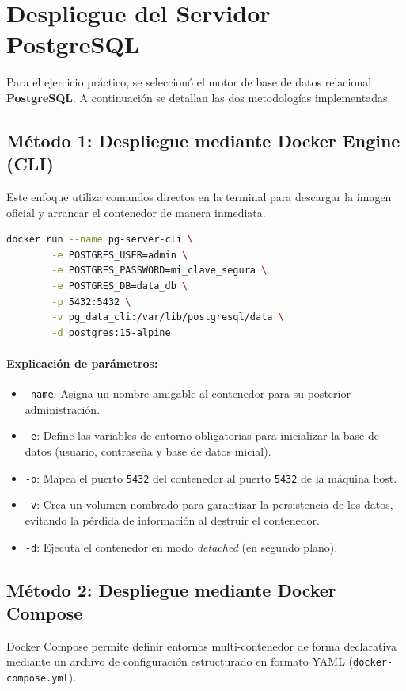 \documentclass[12pt, doc]{apa7} %
\begin{document}
	\section{Despliegue del Servidor PostgreSQL}
	Para el ejercicio práctico, se seleccionó el motor de base de datos relacional \textbf{PostgreSQL}. A continuación se detallan las dos metodologías implementadas.
	
	\subsection{Método 1: Despliegue mediante Docker Engine (CLI)}
	Este enfoque utiliza comandos directos en la terminal para descargar la imagen oficial y arrancar el contenedor de manera inmediata.
	
	\begin{lstlisting}[language=bash, caption={Comando para desplegar PostgreSQL desde la CLI}]
		docker run --name pg-server-cli \
		-e POSTGRES_USER=admin \
		-e POSTGRES_PASSWORD=mi_clave_segura \
		-e POSTGRES_DB=data_db \
		-p 5432:5432 \
		-v pg_data_cli:/var/lib/postgresql/data \
		-d postgres:15-alpine
	\end{lstlisting}
	
	\paragraph{Explicación de parámetros:}
	\begin{itemize}
		\item \texttt{--name}: Asigna un nombre amigable al contenedor para su posterior administración.
		\item \texttt{-e}: Define las variables de entorno obligatorias para inicializar la base de datos (usuario, contraseña y base de datos inicial).
		\item \texttt{-p}: Mapea el puerto \texttt{5432} del contenedor al puerto \texttt{5432} de la máquina host.
		\item \texttt{-v}: Crea un volumen nombrado para garantizar la persistencia de los datos, evitando la pérdida de información al destruir el contenedor.
		\item \texttt{-d}: Ejecuta el contenedor en modo \textit{detached} (en segundo plano).
	\end{itemize}
	
	\subsection{Método 2: Despliegue mediante Docker Compose}
	Docker Compose permite definir entornos multi-contenedor de forma declarativa mediante un archivo de configuración estructurado en formato YAML (\texttt{docker-compose.yml}).
	
\end{document}
